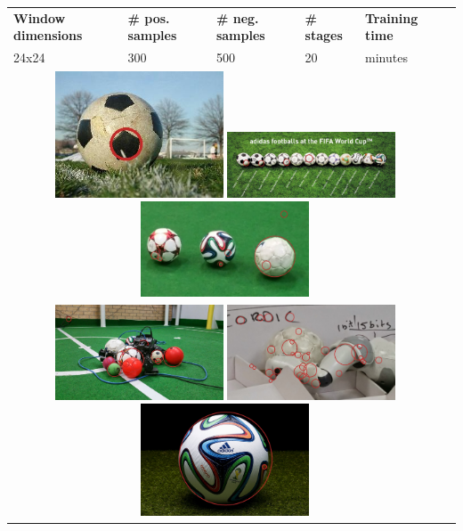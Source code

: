 \begin{tabularx}{\textwidth}{llllll}
    \label{table:interim-results}
    \textbf{Window dimensions} & \textbf{\# pos. samples} & \textbf{\# neg. samples} & \textbf{\# stages} & \textbf{Training time} \\
    24x24 & 300 & 500 & 20 & \mytilda7 minutes \\
    \multicolumn{5}{c}{
        \includegraphics[width=5.0cm]{results/1/sphere_3}
        \includegraphics[width=5.0cm]{results/1/sphere_4}
        \includegraphics[width=5.0cm]{results/1/sphere_5}
    } \\
    \multicolumn{5}{c}{
        \includegraphics[width=5.0cm]{results/1/sphere_6}
        \includegraphics[width=5.0cm]{results/1/sphere_7}
        \includegraphics[width=5.0cm]{results/1/sphere_8}
}
\end{tabularx}
